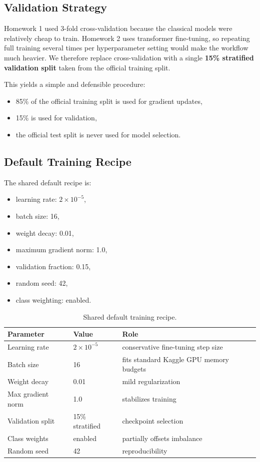 \subsection{Validation Strategy}

Homework 1 used 3-fold cross-validation because the classical models were relatively cheap to train. Homework 2 uses transformer fine-tuning, so repeating full training several times per hyperparameter setting would make the workflow much heavier. We therefore replace cross-validation with a single \textbf{15\% stratified validation split} taken from the official training split.

This yields a simple and defensible procedure:
\begin{itemize}
	\item 85\% of the official training split is used for gradient updates,
	\item 15\% is used for validation,
	\item the official test split is never used for model selection.
\end{itemize}

\subsection{Default Training Recipe}

The shared default recipe is:
\begin{itemize}
	\item learning rate: $2 \times 10^{-5}$,
	\item batch size: 16,
	\item weight decay: 0.01,
	\item maximum gradient norm: 1.0,
	\item validation fraction: 0.15,
	\item random seed: 42,
	\item class weighting: enabled.
\end{itemize}

\begin{table}[h]
\centering
\small
\begin{tabularx}{\textwidth}{Xll}
\toprule
Parameter & Value & Role \\
\midrule
Learning rate & $2 \times 10^{-5}$ & conservative fine-tuning step size \\
Batch size & 16 & fits standard Kaggle GPU memory budgets \\
Weight decay & 0.01 & mild regularization \\
Max gradient norm & 1.0 & stabilizes training \\
Validation split & 15\% stratified & checkpoint selection \\
Class weights & enabled & partially offsets imbalance \\
Random seed & 42 & reproducibility \\
\bottomrule
\end{tabularx}
\caption{Shared default training recipe.}
\label{tab:default-recipe}
\end{table}

